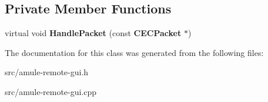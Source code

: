 \subsection*{Private Member Functions}
\begin{DoxyCompactItemize}
\item 
virtual void {\bfseries HandlePacket} (const {\bf CECPacket} $\ast$)\label{classCFriendListRem_aeead3ac02a10de0a85fd717e39dc2d87}

\end{DoxyCompactItemize}


The documentation for this class was generated from the following files:\begin{DoxyCompactItemize}
\item 
src/amule-\/remote-\/gui.h\item 
src/amule-\/remote-\/gui.cpp\end{DoxyCompactItemize}
